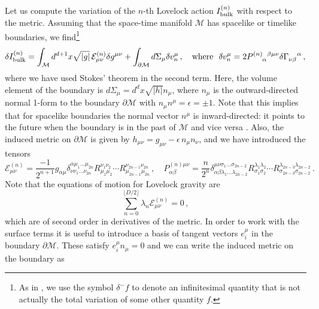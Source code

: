 \documentclass[11pt,letterpaper]{article}
\newcommand{\E}{\mathcal{E}}
\newcommand{\dslash}{\delta^{\!\!\!\!-}\!}
\begin{document}
Let us compute the variation of the $n$-th Lovelock action $I_{\rm bulk}^{(n)}$ with respect to the metric. Assuming that the space-time manifold $\mathcal{M}$ has spacelike or timelike boundaries, we find\footnote{As in \cite{Lehner:2016vdi}, we use the symbol $\dslash f $ to denote an infinitesimal quantity that is not actually the total variation of some other quantity $f$.}
\begin{equation}
\delta I_{\rm bulk}^{(n)}=\int_{\mathcal{M}} d^{d+1}x\sqrt{|g|}\,\E^{(n)}_{\mu\nu}\delta g^{\mu\nu}+\int_{\partial \mathcal{M}} d\Sigma_{\mu}\dslash v^{\mu}_{n}\, ,\quad \text{where}\, \, \, \,\dslash  v^{\mu}_{n}=2 P^{(n)\,\,\,\,\beta\mu\nu} _{\,\,\,\,\,\,\,\,\, \alpha}\delta \Gamma^{\ \ \ \alpha}_{\nu\beta}\, ,
\label{varf}
\end{equation}
where we have used Stokes' theorem in the second term. Here, the volume element of the boundary is $d\Sigma_{\mu}=d^{d}x\sqrt{|h|} n_{\mu}$, where $n_{\mu}$ is the outward-directed normal 1-form to the boundary $\partial \mathcal{M}$ with $n_{\mu}n^{\mu}=\epsilon=\pm 1$. Note that this implies that for spacelike boundaries the normal vector $n^{\mu}$ is inward-directed: it points to the future when the boundary is in the past of $\mathcal{M}$ and vice versa \cite{Carroll:2004st}. Also, the induced metric on $\partial\mathcal{M}$ is given by $h_{\mu\nu}=g_{\mu\nu}-\epsilon\, n_{\mu}n_{\nu}$, and we have introduced the tensors
\begin{equation}
\mathcal{E}_{\mu\nu}^{(n)}=\frac{-1}{2^{n+1}}g_{\alpha \mu}\delta^{\alpha \mu_1\dots \mu_{2n}}_{\nu \nu_1\dots \nu_{2n}} R^{\nu_1\nu_2}_{\mu_1\mu_2}\cdots R^{\nu_{2n-1}\nu_{2n}}_{\mu_{2n-1}\mu_{2n}}\, , \quad P^{(n)\mu\nu}_{\alpha\beta}=\frac{n}{2^n}\delta^{\mu\nu \sigma_1\dots\sigma_{2n-2}}_{\alpha \beta \lambda_1\dots \lambda_{2n-2}}R_{\sigma_1\sigma_2}^{\lambda_1\lambda_2}\cdots R_{\sigma_{2n-3}\sigma_{2n-2}}^{\lambda_{2n-3}\lambda_{2n-2}} \, .
\label{love}
\end{equation}
Note that the equations of motion for Lovelock gravity are
\begin{equation}
\sum_{n=0}^{\lfloor D/2 \rfloor} \lambda_n\mathcal{E}_{\mu\nu}^{(n)}=0\, ,
\end{equation}
which are of second order in derivatives of the metric. In order to work with the surface terms it is useful to introduce a basis of tangent vectors ${e_i^{\mu}}$ in the boundary $\partial\mathcal{M}$. These satisfy $e_i^{\mu}n_{\mu}=0$ and we can write the induced metric on the boundary as
\end{document}
